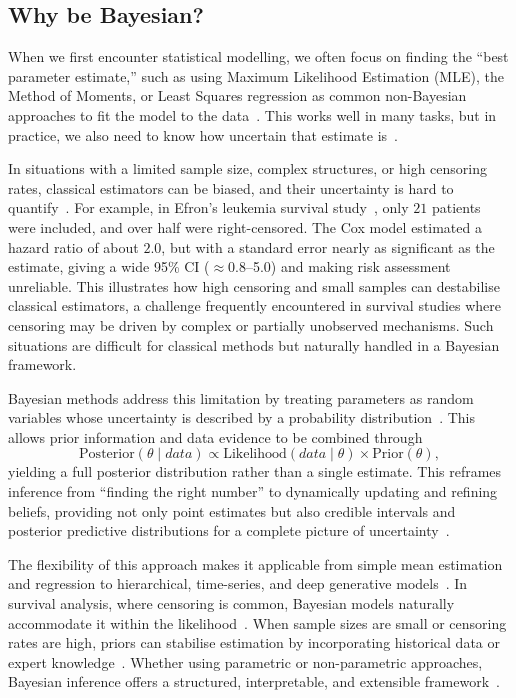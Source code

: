 


\subsection{Why be Bayesian?}\label{Why Bayesian}
When we first encounter statistical modelling, we often focus on finding the “best parameter estimate,” such as using Maximum Likelihood Estimation (MLE), the Method of Moments, or Least Squares regression as common non-Bayesian approaches to fit the model to the data~\cite{van2021bayesian}. This works well in many tasks, but in practice, we also need to know how uncertain that estimate is~\cite{gelman1995bayesian}. 

In situations with a limited sample size, complex structures, or high censoring rates, classical estimators can be biased, and their uncertainty is hard to quantify~\cite{van2021bayesian, ibrahim2013bayesian}. For example, in Efron’s leukemia survival study~\cite{Efron01091977}, only $21$ patients were included, and over half were right-censored. The Cox model estimated a hazard ratio of about $2.0$, but with a standard error nearly as significant as the estimate, giving a wide 95\% CI ($\approx$0.8–5.0) and making risk assessment unreliable. This illustrates how high censoring and small samples can destabilise classical estimators, a challenge frequently encountered in survival studies where censoring may be driven by complex or partially unobserved mechanisms. Such situations are difficult for classical methods but naturally handled in a Bayesian framework.

Bayesian methods address this limitation by treating parameters as random variables whose uncertainty is described by a probability distribution~\cite{gelman1995bayesian}. This allows prior information and data evidence to be combined through
$$
\text{Posterior}(\theta \mid data)
\propto
\text{Likelihood}(data \mid \theta)
\times
\text{Prior}(\theta),
$$
yielding a full posterior distribution rather than a single estimate. This reframes inference from “finding the right number” to dynamically updating and refining beliefs, providing not only point estimates but also credible intervals and posterior predictive distributions for a complete picture of uncertainty~\cite{gelman1995bayesian}.

The flexibility of this approach makes it applicable from simple mean estimation and regression to hierarchical, time-series, and deep generative models~\cite{carlin1997bayes}. In survival analysis, where censoring is common, Bayesian models naturally accommodate it within the likelihood~\cite{bartovs2022informed}. When sample sizes are small or censoring rates are high, priors can stabilise estimation by incorporating historical data or expert knowledge~\cite{gelman1995bayesian}. Whether using parametric or non-parametric approaches, Bayesian inference offers a structured, interpretable, and extensible framework~\cite{van2021bayesian}. 

